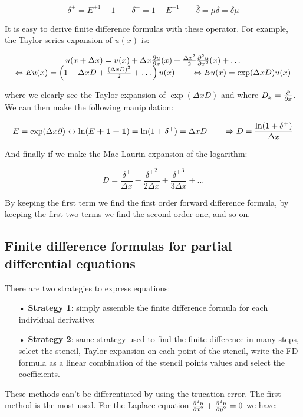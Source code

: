 \begin{equation}
\delta^+ = E^{+1}-1 \qquad \delta^- = 1-E^{-1} \qquad \bar{\delta} = \mu \delta = \delta \mu 
\end{equation}

It is easy to derive finite difference formulas with these operator. For example, the Taylor series expansion of $u(x)$ is: 

\begin{equation}
\begin{array}{c}
u(x+\Delta x) = u(x) + \Delta x\frac{\partial u}{\partial x} (x) + \frac{\Delta x^2}{2} \frac{\partial^2u}{\partial x^2}(x) + \dots \\
 \Leftrightarrow E u(x) = \left( 1 + \Delta x D + \frac{(\Delta x D)^2}{2} + \dots \right) u(x) \qquad \Leftrightarrow Eu(x) = \exp (\Delta x D) u(x)
 \end{array}
\end{equation}

where we clearly see the Taylor expansion of $\exp (\Delta x D)$ and where $D_x = \frac{\partial}{\partial x}$. We can then make the following manipulation: 

\begin{equation}
E = \exp (\Delta x \partial) \leftrightarrow \ln (E \bm{+1 - 1}) = \ln(1 + \delta ^+) = \Delta x D \qquad \Rightarrow D = \frac{\ln (1 + \delta ^+)}{\Delta x}
\end{equation}

And finally if we make the Mac Laurin expansion of the logarithm: 

\begin{equation}
D = \frac{\delta ^+}{\Delta x} - \frac{{\delta ^+}^2}{2\Delta x} + \frac{{\delta ^+}^3}{3\Delta x} + \dots
\end{equation}

By keeping the first term we find the first order forward difference formula, by keeping the first two terms we find the second order one, and so on. 

\subsection{Finite difference formulas for partial differential equations}

There are two strategies to express equations: 
\begin{itemize}
\item[•] \textbf{Strategy 1}: simply assemble the finite difference formula for each individual derivative;
\item[•] \textbf{Strategy 2}: same strategy used to find the finite difference in many steps, select the stencil, Taylor expansion on each point of the stencil, write the FD formula as a linear combination of the stencil points values and select the coefficients. 
\end{itemize}
These methods can't be differentiated by using the trucation error.
The first method is the most used. For the Laplace equation $\frac{\partial ^2 u}{\partial x^2}+ \frac{\partial ^2 u}{\partial y^2} = 0$ we have: 

